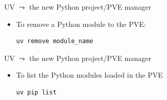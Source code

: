 \documentclass[11pt, serif, mathserif, compress]{beamer}  %
\newcommand{\boldtt}[1]{{\ttfamily\bfseries #1}}
\begin{document}
\begin{frame}[fragile]{UV $\leadsto$ the new Python project/PVE manager}

  \begin{tcolorbox}[title=Command: \boldtt{uv remove}, add to width=5mm]
    \begin{itemize}
    \item To remove a Python module to the PVE:
      \begin{verbatim}
uv remove module_name
      \end{verbatim}
    \end{itemize}
  \end{tcolorbox}

  
\end{frame}


\begin{frame}[fragile]{UV $\leadsto$ the new Python project/PVE manager}

  \begin{tcolorbox}[title=Command: \boldtt{uv pip list}, add to width=5mm]
    \begin{itemize}\setlength\itemsep{0mm}
    \item To list the Python modules loaded in the PVE
      \begin{verbatim}
uv pip list
      \end{verbatim}
    \end{itemize}
  \end{tcolorbox}

\end{frame}
\end{document}
